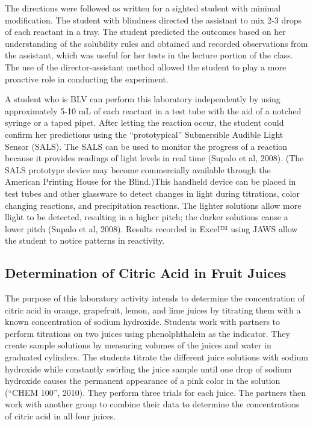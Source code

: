 \documentclass[11.5pt]{sig-alternate} %
\begin{document}
\begin{large}
The directions were followed as written for a sighted student with minimal modification. The student with blindness directed the assistant to mix 2-3 drops of each reactant in a tray. The student predicted the outcomes based on her understanding of the solubility rules and obtained and recorded observations from the assistant, which was useful for her tests in the lecture portion of the class. The use of the director-assistant method allowed the student to play a more proactive role in conducting the experiment. 

A student who is BLV can perform this laboratory independently by using approximately 5-10 mL of each reactant in a test tube with the aid of a notched syringe or a taped pipet. After letting the reaction occur, the student could confirm her predictions using the “prototypical” Submersible Audible Light Sensor (SALS). The SALS can be used to monitor the progress of a reaction because it provides readings of light levels in real time (Supalo et al, 2008). (The SALS prototype device may become commercially available through the American Printing House for the Blind.)This handheld device can be placed in test tubes and other glassware to detect changes in light during titrations, color changing reactions, and precipitation reactions. The lighter solutions allow more llight to be detected, resulting in a higher pitch; the darker solutions cause a lower pitch (Supalo et al, 2008). Results recorded in Excel™ using JAWS allow the student to notice patterns in reactivity. 

\subsection*{Determination of Citric Acid in Fruit Juices}

The purpose of this laboratory activity intends to determine the concentration of citric acid in orange, grapefruit, lemon, and lime juices by titrating them with a known concentration of sodium hydroxide. Students work with partners to perform titrations on two juices using phenolphthalein as the indicator. They create sample solutions by measuring volumes of the juices and water in graduated cylinders. The students titrate the different juice solutions with sodium hydroxide while constantly swirling the juice sample until one drop of sodium hydroxide causes the permanent appearance of a pink color in the solution (“CHEM 100”, 2010). They perform three trials for each juice. The partners then work with another group to combine their data to determine the concentrations of citric acid in all four juices. 


\end{large}
\end{document}
